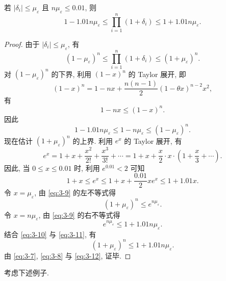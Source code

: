 \begin{theorem}
\label{thm:3-11}
若 $|\delta_i|\leqslant\mu_\varepsilon$ 且 $n\mu_\varepsilon\leqslant0.01$, 则
\[
  1-1.01n\mu_\varepsilon\leqslant\prod_{i=1}^{n}(1+\delta_i)
  \leqslant1+1.01n\mu_\varepsilon.
\]
\end{theorem}

\begin{proof}
由于 $|\delta_i|\leqslant\mu_\varepsilon$, 有
\begin{equation}
  (1-\mu_\varepsilon)^n\leqslant\prod_{i=1}^{n}(1+\delta_i)\leqslant(1+\mu_\varepsilon)^n.
  \label{eq:3-7}
\end{equation}
对 $(1-\mu_\varepsilon)^n$ 的下界, 利用 $(1-x)^n$ 的 Taylor 展开, 即
\[
  (1-x)^n=1-nx+\frac{n(n-1)}{2}(1-\theta x)^{n-2}x^2,
\]
有
\[
  1-nx\leqslant(1-x)^n.
\]
因此
\begin{equation}
  1-1.01n\mu_\varepsilon\leqslant1-n\mu_\varepsilon\leqslant(1-\mu_\varepsilon)^n.
  \label{eq:3-8}
\end{equation}
现在估计 $(1+\mu_\varepsilon)^n$ 的上界. 利用 $e^x$ 的 Taylor 展开, 有
\[
  e^x=1+x+\frac{x^2}{2!}+\frac{x^3}{3!}+\cdots
  =1+x+\frac{x}{2}\cdot x\cdot\left(1+\frac{x}{3}+\cdots\right).
\]
因此, 当 $0\leqslant x\leqslant0.01$ 时, 利用 $e^{0.01}<2$ 可知
\begin{equation}
  1+x\leqslant e^x\leqslant1+x+\frac{0.01}{2}xe^x\leqslant1+1.01x.
  \label{eq:3-9}
\end{equation}
令 $x=\mu_\varepsilon$, 由 \eqref{eq:3-9} 的左不等式得
\begin{equation}
  (1+\mu_\varepsilon)^n\leqslant e^{n\mu_\varepsilon}.
  \label{eq:3-10}
\end{equation}
令 $x=n\mu_\varepsilon$, 由 \eqref{eq:3-9} 的右不等式得
\begin{equation}
  e^{n\mu_\varepsilon}\leqslant1+1.01n\mu_\varepsilon.
  \label{eq:3-11}
\end{equation}
结合 \eqref{eq:3-10} 与 \eqref{eq:3-11}, 有
\begin{equation}
  (1+\mu_\varepsilon)^n\leqslant1+1.01n\mu_\varepsilon.
  \label{eq:3-12}
\end{equation}
由 \eqref{eq:3-7}, \eqref{eq:3-8} 与 \eqref{eq:3-12}, 证毕.
\end{proof}

考虑下述例子.

